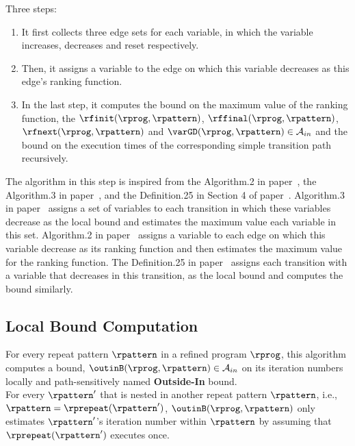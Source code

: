 Three steps:
\begin{enumerate}
    \item It first collects three edge sets for each variable,
  in which the variable increases, decreases and reset respectively.
  \item
  Then, it assigns a variable to the edge on which this variable decreases as this edge's ranking function.
  \item
  In the last step, it computes the bound on the maximum value of the ranking function,
  the $\rfinit(\rprog, \rpattern)$,
  $\rffinal(\rprog, \rpattern)$, $\rfnext(\rprog, \rpattern)$ and $\varGD(\rprog, \rpattern) \in \mathcal{A}_{in}$
   and the bound on the execution
  times of the corresponding simple transition path recursively.
  \end{enumerate}

  The algorithm in this step is inspired from the Algorithm.2 in paper~\cite{SinnZV14},
  the Algorithm.3 in paper~\cite{ZulegerGSV11},
  and the Definition.25 in Section 4 of paper~\cite{sinn2017complexity}.
  Algorithm.3 in paper~\cite{ZulegerGSV11} assigns a set of variables to each transition in which these variables decrease as the local bound
  and estimates the maximum value each variable in this set.
  Algorithm.2 in paper~\cite{SinnZV14} assigns a variable to each edge on which this variable decrease as its ranking function
  and then estimates the maximum value for the ranking function.
  The Definition.25 in paper~\cite{sinn2017complexity}
  assigns each transition with a variable that decreases in this transition, as the local bound and computes the bound similarly.

\subsection{Local Bound Computation}
  For every repeat pattern $\rpattern$ in a refined program $\rprog$, 
this algorithm
computes a bound, $\outinB(\rprog, \rpattern) \in \mathcal{A}_{in}$ on its iteration numbers locally and path-sensitively
named \textbf{Outside-In} bound.
\\
For every $\rpattern'$ that is nested
in another repeat pattern $\rpattern$, i.e., $\rpattern = \rprepeat(\rpattern')$,
$\outinB(\rprog, \rpattern)$ only estimates
$\rpattern'$'s iteration number within $\rpattern$ by assuming that $\rprepeat(\rpattern')$ executes once.

